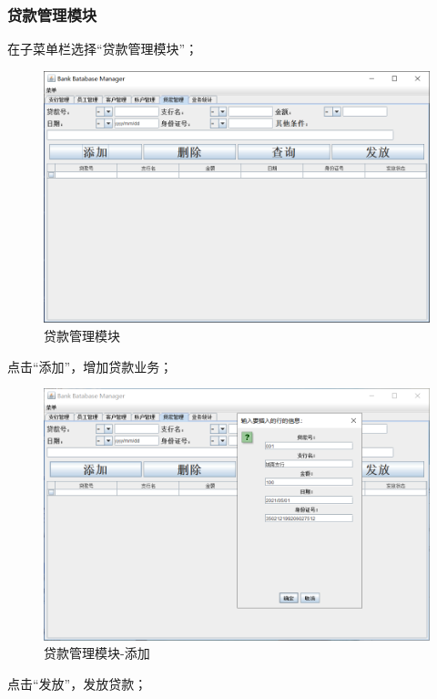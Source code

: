 \documentclass{ctexart}
\begin{document}
\subsubsection{\hei 贷款管理模块}
在子菜单栏选择“贷款管理模块”；
\par 
\begin{figure}[H]
    \centering
    \includegraphics[scale=0.2]{dk.png}
    \caption{贷款管理模块}
\end{figure}
点击“添加”，增加贷款业务；
\begin{figure}[H]
    \centering
    \includegraphics[scale=0.2]{dk1.png}
    \caption{贷款管理模块-添加}
\end{figure}
\par
点击“发放”，发放贷款；
\end{document}

